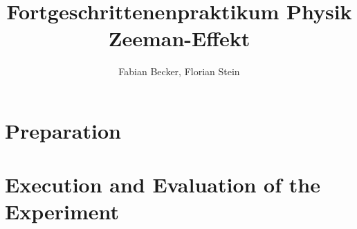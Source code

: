 \documentclass[]{report}
\title{Fortgeschrittenenpraktikum Physik \\ Zeeman-Effekt}
\author{Fabian Becker, Florian Stein}
\numberwithin{equation}{chapter}
\begin{document}
\maketitle
\tableofcontents
\newpage
\chapter{Preparation}

\chapter{Execution and Evaluation of the Experiment}

\end{document}
